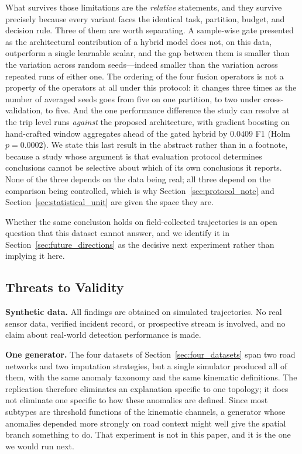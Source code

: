 \documentclass[journal]{IEEEtran}
\begin{document}
What survives those limitations are the \emph{relative} statements, and they survive precisely because every variant faces the identical task, partition, budget, and decision rule. Three of them are worth separating. A sample-wise gate presented as the architectural contribution of a hybrid model does not, on this data, outperform a single learnable scalar, and the gap between them is smaller than the variation across random seeds---indeed smaller than the variation across repeated runs of either one. The ordering of the four fusion operators is not a property of the operators at all under this protocol: it changes three times as the number of averaged seeds goes from five on one partition, to two under cross-validation, to five. And the one performance difference the study can resolve at the trip level runs \emph{against} the proposed architecture, with gradient boosting on hand-crafted window aggregates ahead of the gated hybrid by $0.0409$ F1 (Holm $p = 0.0002$). We state this last result in the abstract rather than in a footnote, because a study whose argument is that evaluation protocol determines conclusions cannot be selective about which of its own conclusions it reports. None of the three depends on the data being real; all three depend on the comparison being controlled, which is why Section~\ref{sec:protocol_note} and Section~\ref{sec:statistical_unit} are given the space they are.

Whether the same conclusion holds on field-collected trajectories is an open question that this dataset cannot answer, and we identify it in Section~\ref{sec:future_directions} as the decisive next experiment rather than implying it here.

\subsection{Threats to Validity}
\label{sec:threats}

\textbf{Synthetic data.} All findings are obtained on simulated trajectories. No real sensor data, verified incident record, or prospective stream is involved, and no claim about real-world detection performance is made.

\textbf{One generator.} The four datasets of Section~\ref{sec:four_datasets} span two road networks and two imputation strategies, but a single simulator produced all of them, with the same anomaly taxonomy and the same kinematic definitions. The replication therefore eliminates an explanation specific to one topology; it does not eliminate one specific to how these anomalies are defined. Since most subtypes are threshold functions of the kinematic channels, a generator whose anomalies depended more strongly on road context might well give the spatial branch something to do. That experiment is not in this paper, and it is the one we would run next.
\end{document}
